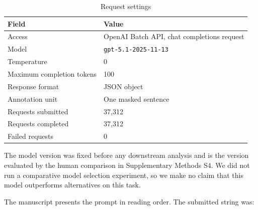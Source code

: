 \begin{table}[htbp]
\centering\small
\caption{Request settings}
\begin{tabular}{@{}p{}p{}@{}}
\toprule
\textbf{Field} & \textbf{Value} \\
\midrule
Access & OpenAI Batch API, chat completions request \\
Model & \texttt{gpt-5.1-2025-11-13} \\
Temperature & 0 \\
Maximum completion tokens & 100 \\
Response format & JSON object \\
Annotation unit & One masked sentence \\
Requests submitted & 37,312 \\
Requests completed & 37,312 \\
Failed requests & 0 \\
\bottomrule
\end{tabular}
\end{table}

The model version was fixed before any downstream analysis and is the version evaluated by the human comparison in Supplementary Methods S4. We did not run a comparative model selection experiment, so we make no claim that this model outperforms alternatives on this task.

The manuscript presents the prompt in reading order. The submitted string was:

